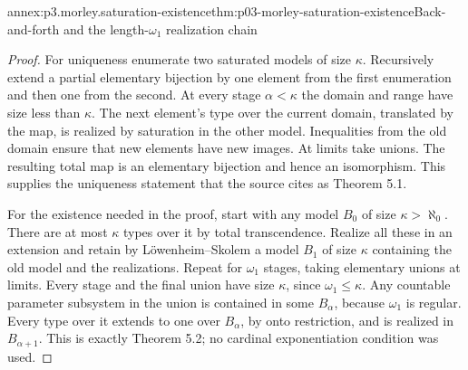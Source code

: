 \begin{annexitem}{annex:p3.morley.saturation-existence}{thm:p03-morley-saturation-existence}{Back-and-forth and the length-\(\omega_1\) realization chain}
\begin{proof}
For uniqueness enumerate
two saturated models of
size \(\kappa\). Recursively
extend a partial elementary
bijection by one element
from the first enumeration
and then one from the
second. At every stage
\(\alpha<\kappa\) the
domain and range have
size less than \(\kappa\).
The next element's type
over the current domain,
translated by the map,
is realized by saturation
in the other model.
Inequalities from the
old domain ensure that
new elements have new
images. At limits take
unions. The resulting
total map is an elementary
bijection and hence an
isomorphism. This supplies
the uniqueness statement
that the source cites
as Theorem 5.1.

For the existence needed
in the proof, start with
any model \(B_0\) of
size \(\kappa>\aleph_0\).
There are at most
\(\kappa\) types over it
by total transcendence.
Realize all these in
an extension and retain
by Löwenheim--Skolem a
model \(B_1\) of size
\(\kappa\) containing
the old model and the
realizations. Repeat for
\(\omega_1\) stages,
taking elementary unions
at limits. Every stage
and the final union
have size \(\kappa\),
since \(\omega_1\leq\kappa\).
Any countable parameter
subsystem in the union
is contained in some
\(B_\alpha\), because
\(\omega_1\) is regular.
Every type over it extends
to one over \(B_\alpha\),
by onto restriction, and
is realized in
\(B_{\alpha+1}\). This
is exactly Theorem 5.2;
no cardinal exponentiation
condition was used.
\end{proof}
\end{annexitem}

